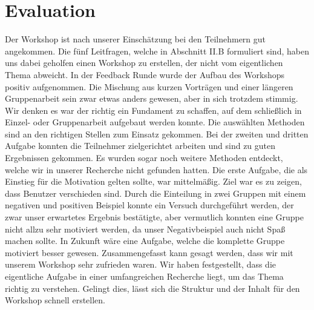 \section{Evaluation}

Der Workshop ist nach unserer Einschätzung bei den Teilnehmern gut angekommen. Die fünf Leitfragen, welche in Abschnitt II.B formuliert sind, haben uns dabei geholfen einen Workshop zu erstellen, der nicht vom eigentlichen Thema abweicht. 
In der Feedback Runde wurde der Aufbau des Workshops positiv aufgenommen. Die Mischung aus kurzen Vorträgen und einer längeren Gruppenarbeit sein zwar etwas anders gewesen, aber in sich trotzdem stimmig. Wir denken es war der richtig ein Fundament zu schaffen, auf dem schließlich in Einzel- oder Gruppenarbeit aufgebaut werden konnte. 
Die auswählten Methoden sind an den richtigen Stellen zum Einsatz gekommen. Bei der zweiten und dritten Aufgabe konnten die Teilnehmer zielgerichtet arbeiten und sind zu guten Ergebnissen gekommen. Es wurden sogar noch weitere Methoden entdeckt, welche wir in unserer Recherche nicht gefunden hatten.  Die erste Aufgabe, die als Einstieg für die Motivation gelten sollte, war mittelmäßig. Ziel war es zu zeigen, dass Benutzer verschieden sind. Durch die Einteilung in zwei Gruppen mit einem negativen und positiven Beispiel konnte ein Versuch durchgeführt werden, der zwar unser erwartetes Ergebnis bestätigte, aber vermutlich konnten eine Gruppe nicht allzu sehr motiviert werden, da unser Negativbeispiel auch nicht Spaß machen sollte. In Zukunft wäre eine Aufgabe, welche die komplette Gruppe motiviert besser gewesen. 
Zusammengefasst kann gesagt werden, dass wir mit unserem Workshop sehr zufrieden waren. Wir haben festgestellt, dass die eigentliche Aufgabe in einer umfangreichen Recherche liegt, um das Thema richtig zu verstehen. Gelingt dies, lässt sich die Struktur und der Inhalt für den Workshop schnell erstellen.
  